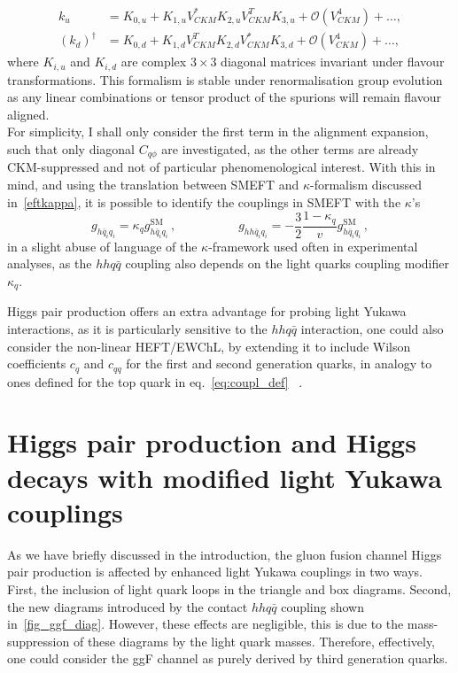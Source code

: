  \begin{align}
 	k_u &= K_{0,u}+ K_{1,u} V^*_{CKM} K_{2,u} V^T_{CKM} K_{3,u} + \mathcal O(V^4_{CKM})+ \dots,  \\
 	(k_d)^\dagger&=K_{0,d}+ K_{1,d} V^T_{CKM} K_{2,d} V^*_{CKM} K_{3,d} + \mathcal O(V^4_{CKM}) + \dots,
 	\label{eqK}
 \end{align}
 where $K_{i,u}$ and $K_{i,d}$ are complex $3\times3$ diagonal matrices invariant under flavour transformations. This formalism is stable under renormalisation group evolution as any linear combinations or tensor product of the spurions will remain flavour aligned. \\
 For simplicity, I shall only consider the first term in the alignment expansion, such that only diagonal $C_{q\phi}$ are investigated, as the other terms are already CKM-suppressed and not of particular phenomenological interest.  With this in mind, and using the translation between SMEFT and $\kappa$-formalism discussed in~\autoref{eftkappa}, it is possible to identify the couplings in SMEFT with the $\kappa$'s
\begin{equation}
	g_{h\bar{q}_i q_i} =\kappa_q g_{h\bar{q}_i q_i}^{\text{SM}} \,, \quad \quad \quad \quad \quad g_{h h\bar{q}_i q_i}= - \frac{3}{2}\frac{1-\kappa_q}{v}g_{h\bar{q}_i q_i}^{\text{SM}} \,,
	\label{eq:def_kappa}
\end{equation}
in a slight abuse of language of the $\kappa$-framework used often in experimental analyses, as the $hhq \bar q$ coupling also depends on the light quarks coupling modifier $\kappa_q$. 
\par
Higgs pair production offers an extra advantage for probing light Yukawa interactions, as it is particularly sensitive to the $hh q\bar q$ interaction, one could also consider the non-linear HEFT/EWChL, by extending it to include Wilson coefficients $c_q$ and $c_{qq}$ for the first and second generation quarks, in analogy to ones defined for the top quark in eq.~\eqref{eq:coupl_def}~ \cite{Contino:2010mh}.
\section{Higgs pair production and Higgs decays with modified light Yukawa couplings \label{sec:qqHH}}
As we have briefly discussed in the introduction, the gluon fusion channel Higgs pair production is affected by enhanced light Yukawa couplings in two ways. First, the inclusion of light quark loops in the triangle and box diagrams. Second, the new diagrams introduced by the contact $hh q\bar q$ coupling shown in~\autoref{fig_ggf_diag}. However, these effects are negligible, this is due to the mass-suppression of these diagrams by the light quark masses. Therefore, effectively, one could consider the ggF channel as purely derived by third generation quarks. 
